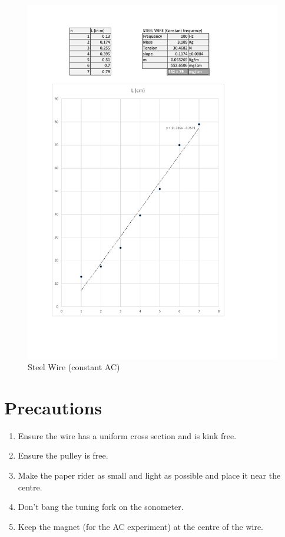 	\begin{figure}[bth]
		\begin{center}
			\includegraphics[width=1.3\linewidth]{gfx/steel_2}
		\end{center}
		\caption[Steel Wire (constant AC)]{Steel Wire (constant AC)}
	\label{4_steel2}
	\end{figure}

	
\section{Precautions}
	\begin{enumerate}		
		\item Ensure the wire has a uniform cross section and is kink free.
		\item Ensure the pulley is free.
		\item Make the paper rider as small and light as possible and place it near the centre.
		\item Don't bang the tuning fork on the sonometer.
		\item Keep the magnet (for the AC experiment) at the centre of the wire.
	\end{enumerate}
